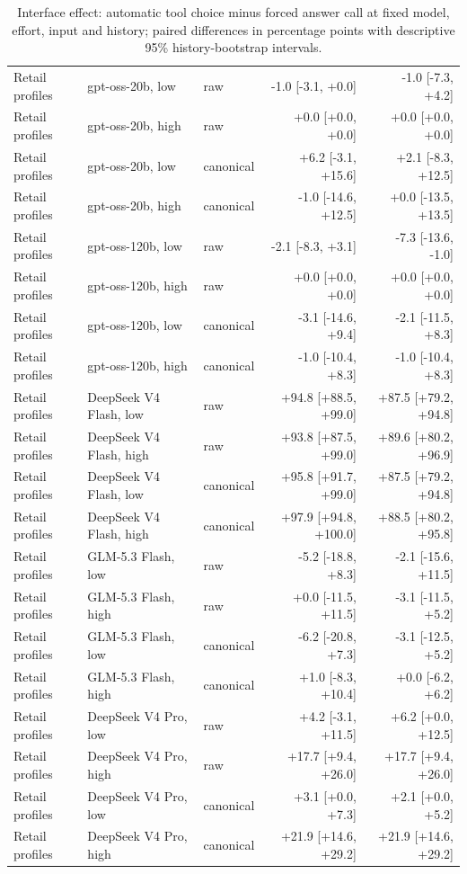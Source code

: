 \begin{table}[htbp]
\begin{tabular}{lllrr}
Retail profiles & gpt-oss-20b, low & raw & -1.0 [-3.1, +0.0] & -1.0 [-7.3, +4.2] \\
Retail profiles & gpt-oss-20b, high & raw & +0.0 [+0.0, +0.0] & +0.0 [+0.0, +0.0] \\
Retail profiles & gpt-oss-20b, low & canonical & +6.2 [-3.1, +15.6] & +2.1 [-8.3, +12.5] \\
Retail profiles & gpt-oss-20b, high & canonical & -1.0 [-14.6, +12.5] & +0.0 [-13.5, +13.5] \\
Retail profiles & gpt-oss-120b, low & raw & -2.1 [-8.3, +3.1] & -7.3 [-13.6, -1.0] \\
Retail profiles & gpt-oss-120b, high & raw & +0.0 [+0.0, +0.0] & +0.0 [+0.0, +0.0] \\
Retail profiles & gpt-oss-120b, low & canonical & -3.1 [-14.6, +9.4] & -2.1 [-11.5, +8.3] \\
Retail profiles & gpt-oss-120b, high & canonical & -1.0 [-10.4, +8.3] & -1.0 [-10.4, +8.3] \\
Retail profiles & DeepSeek V4 Flash, low & raw & +94.8 [+88.5, +99.0] & +87.5 [+79.2, +94.8] \\
Retail profiles & DeepSeek V4 Flash, high & raw & +93.8 [+87.5, +99.0] & +89.6 [+80.2, +96.9] \\
Retail profiles & DeepSeek V4 Flash, low & canonical & +95.8 [+91.7, +99.0] & +87.5 [+79.2, +94.8] \\
Retail profiles & DeepSeek V4 Flash, high & canonical & +97.9 [+94.8, +100.0] & +88.5 [+80.2, +95.8] \\
Retail profiles & GLM-5.3 Flash, low & raw & -5.2 [-18.8, +8.3] & -2.1 [-15.6, +11.5] \\
Retail profiles & GLM-5.3 Flash, high & raw & +0.0 [-11.5, +11.5] & -3.1 [-11.5, +5.2] \\
Retail profiles & GLM-5.3 Flash, low & canonical & -6.2 [-20.8, +7.3] & -3.1 [-12.5, +5.2] \\
Retail profiles & GLM-5.3 Flash, high & canonical & +1.0 [-8.3, +10.4] & +0.0 [-6.2, +6.2] \\
Retail profiles & DeepSeek V4 Pro, low & raw & +4.2 [-3.1, +11.5] & +6.2 [+0.0, +12.5] \\
Retail profiles & DeepSeek V4 Pro, high & raw & +17.7 [+9.4, +26.0] & +17.7 [+9.4, +26.0] \\
Retail profiles & DeepSeek V4 Pro, low & canonical & +3.1 [+0.0, +7.3] & +2.1 [+0.0, +5.2] \\
Retail profiles & DeepSeek V4 Pro, high & canonical & +21.9 [+14.6, +29.2] & +21.9 [+14.6, +29.2] \\
\bottomrule
\end{tabular}
\caption{Interface effect: automatic tool choice minus forced answer call at fixed model, effort, input and history; paired differences in percentage points with descriptive 95\% history-bootstrap intervals.}
\label{tab:interface}
\end{table}
